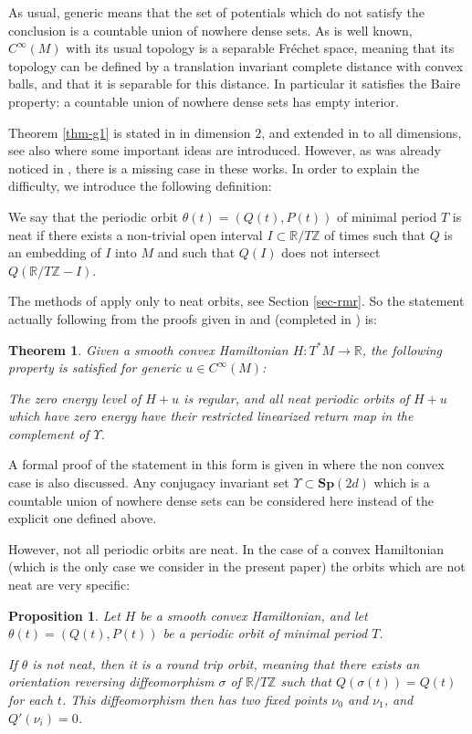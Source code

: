 \documentclass[JEP,XML,SOM,Unicode,published]{cedram}
\newcommand{\Rm}{\mathbb{R}}
\newcommand{\Zm}{\ensuremath{\mathbb{Z}}}
\newcommand{\Sp}{\mathbf{Sp}}
\theoremstyle{plain}
\newtheorem{thm}{Theorem}
\newtheorem{prop}[lem]{Proposition}
\theoremstyle{definition}
\begin{document}
As usual, generic means that the set of potentials which do not satisfy the conclusion is a countable union of nowhere dense sets. As is well known, $C^{\infty}(M)$ with its usual topology is a separable Fréchet space,
meaning that its topology can be defined by a translation invariant complete distance with convex balls, and that it is separable for this distance. In particular it satisfies the Baire property: a countable union of nowhere dense sets has empty interior.

Theorem \ref{thm-g1} is stated in \cite{O08} in dimension $2$, and extended in \cite{RR} to all dimensions, see also \cite{Co10}
where some important ideas are introduced. However, as was already noticed in \cite{AB2},
there is a missing case in these works.
In order to explain the difficulty, we introduce the following definition:

We say that the periodic orbit $\theta(t)=(Q(t), P(t))$ of minimal period $T$ is neat if there exists a non-trivial open interval $I\subset \Rm/T\Zm$ of times such that $Q$ is an embedding of $I$ into $M$ and such that
$Q(I)$ does not intersect $Q(\Rm/T\Zm-I)$.

The methods of \cite{O08,RR} apply only to neat orbits, see Section \ref{sec-rmr}. So the statement actually following from the proofs given in \cite{O08} and \cite{RR}
(completed in \cite{AB}) is:

\begin{thm}\label{thm-g2}
Given a smooth convex Hamiltonian $H: T^*M\rightarrow \Rm$,
the following property is satisfied for generic $u\in C^{\infty}(M)$:

The zero energy level of $H+u$ is regular, and all \emph{neat}
periodic orbits of $H+u$ which have zero energy have their restricted linearized
return map in the complement of $\Upsilon$.
\end{thm}

A formal proof of the statement in this form is given in \cite{AB2} where the non convex case is also discussed. Any
conjugacy invariant set $\Upsilon\subset \Sp(2d)$ which is a countable union of nowhere dense sets can be considered here instead of the explicit one defined above.

However, not all periodic orbits are neat.
In the case of a convex Hamiltonian (which is the only case we consider in the present paper) the orbits which are not neat are very specific:

\begin{prop}\label{prop-neat}
Let $H$ be a smooth convex Hamiltonian, and let $\theta(t)=(Q(t),P(t))$ be a periodic orbit of minimal period $T$.

If $\theta$ is not neat, then it is a \textit{round trip} orbit, meaning that
there exists an orientation reversing diffeomorphism $\sigma$ of $\Rm/T\Zm$ such that $Q(\sigma(t))=Q(t)$ for each $t$. This diffeomorphism then has two fixed points $\nu_0$ and $\nu_1$, and $Q'(\nu_i)=0$.
\end{prop}
\end{document}
